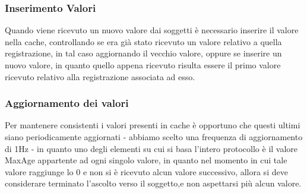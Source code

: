 \subsubsection{Inserimento Valori}
Quando viene ricevuto un nuovo valore dai soggetti è necessario inserire il valore nella cache, controllando se era già stato ricevuto un valore relativo a quella registrazione, in tal caso aggiornando il vecchio valore, oppure se inserire un nuovo valore, in quanto quello appena ricevuto risulta essere il primo valore ricevuto relativo alla registrazione associata ad esso. \\

\subsubsection{Aggiornamento dei valori}
Per mantenere consistenti i valori presenti in cache è opportuno che questi ultimi siano periodicamente aggiornati - abbiamo scelto una frequenza di aggiornamento di 1Hz - in quanto uno degli elementi su cui si basa l'intero protocollo è il valore MaxAge appartente ad ogni singolo valore, in quanto nel momento in cui tale valore raggiunge lo 0 e non si è ricevuto alcun valore successivo, allora si deve considerare terminato l'ascolto verso il soggetto,e non aspettarsi più alcun valore. \\

